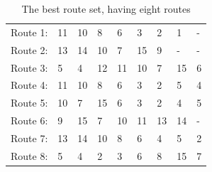 \begin{table}[H]
    \centering
    \begin{tabular}{|l|l l l l l l l l|}
    \hline 
    Route 1: & 11 & 10 & 8 & 6 & 3 & 2 & 1 & - \\
    Route 2: & 13 & 14 & 10 & 7 & 15 & 9 & - & - \\
    Route 3: & 5 & 4 & 12 & 11 & 10 & 7 & 15 & 6 \\
    Route 4: & 11 & 10 & 8 & 6 & 3 & 2 & 5 & 4 \\
    Route 5: & 10 & 7 & 15 & 6 & 3 & 2 & 4 & 5 \\
    Route 6: & 9 & 15 & 7 & 10 & 11 & 13 & 14 & - \\
    Route 7: & 13 & 14 & 10 & 8 & 6 & 4 & 5 & 2 \\
    Route 8: & 5 & 4 & 2 & 3 & 6 & 8 & 15 & 7 \\
    \hline
    \end{tabular}
    \caption {The best route set, having eight routes }
    \label{table:performanceComparison_bestRouteSet8}
    \end{table}

